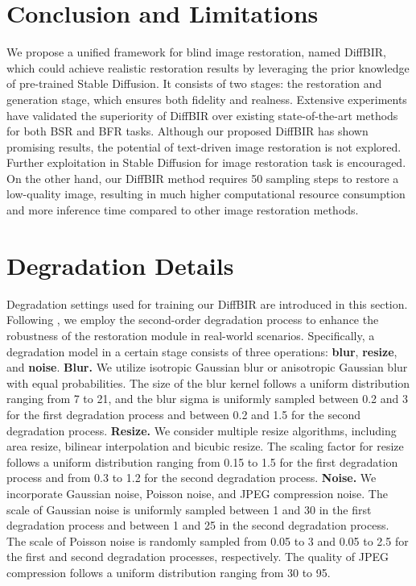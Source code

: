 \documentclass{article}
\begin{document}
\section{Conclusion and Limitations}
We propose a unified framework for blind image restoration, named DiffBIR, which could achieve realistic restoration results by leveraging the prior knowledge of pre-trained Stable Diffusion. It consists of two stages: the restoration and generation stage, which ensures both fidelity and realness. Extensive experiments have validated the superiority of DiffBIR over existing state-of-the-art methods for both BSR and BFR tasks. Although our proposed DiffBIR has shown promising results, the potential of text-driven image restoration is not explored. Further exploitation in Stable Diffusion for image restoration task is encouraged. On the other hand, our DiffBIR method requires 50 sampling steps to restore a low-quality image, resulting in much higher computational resource consumption and more inference time compared to other image restoration methods.


{\small


}



\newpage
\appendix

\section{Degradation Details}
\label{appendix:degradation_details}
Degradation settings used for training our DiffBIR are introduced in this section. Following \cite{realesrgan}, we employ the second-order degradation process to enhance the robustness of the restoration module in real-world scenarios. Specifically, a degradation model in a certain stage consists of three operations: \textbf{blur}, \textbf{resize}, and \textbf{noise}. \noindent\textbf{Blur.} We utilize isotropic Gaussian blur or anisotropic Gaussian blur with equal probabilities. The size of the blur kernel follows a uniform distribution ranging from 7 to 21, and the blur sigma is uniformly sampled between 0.2 and 3 for the first degradation process and between 0.2 and 1.5 for the second degradation process. \noindent\textbf{Resize.} We consider multiple resize algorithms, including area resize, bilinear interpolation and bicubic resize. The scaling factor for resize follows a uniform distribution ranging from 0.15 to 1.5 for the first degradation process and from 0.3 to 1.2 for the second degradation process. \noindent\textbf{Noise.} We incorporate Gaussian noise, Poisson noise, and JPEG compression noise. The scale of Gaussian noise is uniformly sampled between 1 and 30 in the first degradation process and between 1 and 25 in the second degradation process. The scale of Poisson noise is randomly sampled from 0.05 to 3 and 0.05 to 2.5 for the first and second degradation processes, respectively. The quality of JPEG compression follows a uniform distribution ranging from 30 to 95.
\end{document}
